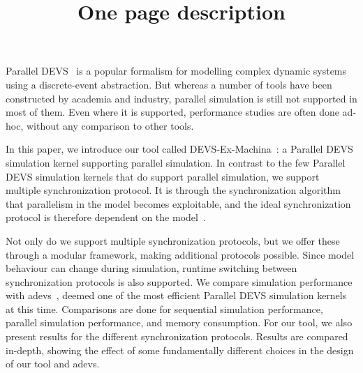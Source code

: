 \documentclass{article}
\begin{document}
\title{One page description}
\date{}
\maketitle

\textsf{Parallel DEVS}~\cite{ParallelDEVS} is a popular formalism for modelling complex dynamic systems using a discrete-event abstraction.
But whereas a number of tools have been constructed by academia and industry, parallel simulation is still not supported in most of them.
Even where it is supported, performance studies are often done ad-hoc, without any comparison to other tools.

In this paper, we introduce our tool called DEVS-Ex-Machina~\cite{dxex}: a \textsf{Parallel DEVS} simulation kernel supporting parallel simulation.
In contrast to the few \textsf{Parallel DEVS} simulation kernels that do support parallel simulation, we support multiple synchronization protocol.
It is through the synchronization algorithm that parallelism in the model becomes exploitable, and the ideal synchronization protocol is therefore dependent on the model~\cite{FujimotoBook}.

Not only do we support multiple synchronization protocols, but we offer these through a modular framework, making additional protocols possible.
Since model behaviour can change during simulation, runtime switching between synchronization protocols is also supported.
We compare simulation performance with adevs~\cite{adevs}, deemed one of the most efficient \textsf{Parallel DEVS} simulation kernels at this time.
Comparisons are done for sequential simulation performance, parallel simulation performance, and memory consumption.
For our tool, we also present results for the different synchronization protocols.
Results are compared in-depth, showing the effect of some fundamentally different choices in the design of our tool and adevs.



\end{document}
